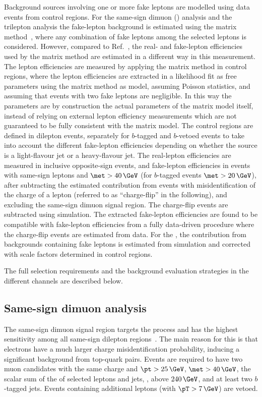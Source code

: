 Background sources involving one or more fake leptons are modelled 
using data events from control regions.  For the same-sign dimuon (\SSLSR) analysis and the
trilepton analysis the fake-lepton background is estimated using the matrix
method~\cite{TOPQ-2010-01}, where any combination of fake leptons among the
selected leptons is considered.  However, compared to Ref.~\cite{TOPQ-2010-01}, the 
real- and fake-lepton efficiencies used by the matrix method are estimated
in a different way in this measurement. The lepton efficiencies are measured by
applying the matrix method in control regions, where the lepton efficiencies
are extracted in a likelihood fit as free parameters using the matrix method
as model, assuming Poisson statistics, and assuming that events with two fake
leptons are negligible. In this way the parameters are by construction the
actual parameters of the matrix model itself, instead of relying on external
lepton efficiency measurements which are not guaranteed to be fully consistent
with the matrix model.
The
control regions are defined in dilepton events, separately for $b$-tagged and
$b$-vetoed events to take into account the different fake-lepton efficiencies
depending on whether the source is a light-flavour jet or a heavy-flavour jet.
The real-lepton efficiencies are measured in inclusive opposite-sign events,
and fake-lepton efficiencies in events with same-sign leptons and $\met>40\,\GeV$
(for $b$-tagged events $\met>20\,\GeV$), after subtracting the estimated
contribution from events with misidentification of the charge of a lepton
(referred to as ``charge-flip'' in the following), and excluding the same-sign dimuon signal region. The charge-flip events are subtracted using simulation. The
extracted fake-lepton efficiencies are found to be compatible with fake-lepton
efficiencies from a fully data-driven procedure where the charge-flip events
are estimated from data.  For the \FLC, the contribution from backgrounds
containing fake leptons is estimated from simulation and corrected with scale
factors determined in control regions.

The full selection requirements and the background evaluation strategies in the
different channels are described below.

\subsection{Same-sign dimuon analysis}

The same-sign dimuon signal region targets the \ttW process and has
the highest sensitivity among all same-sign dilepton
regions~\cite{TOPQ-2013-05}.  The main reason for this is that electrons have a
much larger charge misidentification probability, inducing a significant
background from top-quark pairs.  Events are required to have two muon
candidates with the same charge and $\pt>25\,\GeV$, $\met > 40\,\GeV$, the scalar
sum of the \pT of selected leptons and jets, \HT, above $240\,\GeV$, and at least
two $b$-tagged jets. Events containing additional leptons (with $\pT>7\,\GeV$)
are vetoed.

